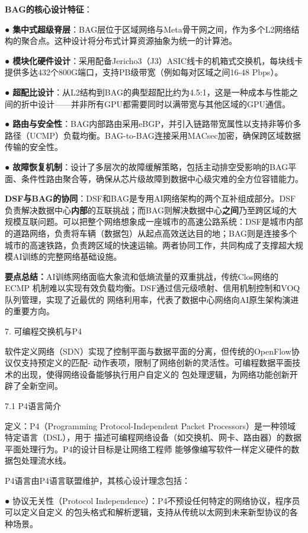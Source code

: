\textbf{BAG的核心设计特征}：

● \textbf{集中式超级脊层}：BAG层位于区域网络与Meta骨干网之间，作为多个L2网络结构的聚合点。这种设计将分布式计算资源抽象为统一的计算池。

● \textbf{模块化硬件设计}：采用配备Jericho3（J3）ASIC线卡的机箱式交换机，每块线卡提供多达432个800G端口，支持PB级带宽（例如每对区域之间16-48 Pbps）。

● \textbf{超配比设计}：从L2结构到BAG的典型超配比约为4.5:1，这是一种成本与性能之间的折中设计——并非所有GPU都需要同时以满带宽与其他区域的GPU通信。

● \textbf{路由与安全性}：BAG内部路由采用eBGP，并引入链路带宽属性以支持非等价多路径（UCMP）负载均衡。BAG-to-BAG连接采用MACsec加密，确保跨区域数据传输的安全性。

● \textbf{故障恢复机制}：设计了多层次的故障缓解策略，包括主动排空受影响的BAG平面、条件性路由聚合等，确保从芯片级故障到数据中心级灾难的全方位容错能力。

\textbf{DSF与BAG的协同}：DSF和BAG是专用AI网络架构的两个互补组成部分。DSF负责解决数据中心\textbf{内部}的互联挑战；而BAG则解决数据中心\textbf{之间}乃至跨区域的大规模互联问题。可以把整个网络想象成一座城市的高速公路系统：DSF是城市内部的道路网络，负责将车辆（数据包）从起点高效送达目的地；BAG则是连接多个城市的高速铁路，负责跨区域的快速运输。两者协同工作，共同构成了支撑超大规模AI训练的完整网络基础设施。

\vspace{0.5em}
\noindent\textbf{要点总结：}AI训练网络面临大象流和低熵流量的双重挑战，传统Clos网络的ECMP
机制难以实现有效负载均衡。DSF通过信元级喷射、信用机制控制和VOQ队列管理，实现了近最优的
网络利用率，代表了数据中心网络向AI原生架构演进的重要方向。


7.  可编程交换机与P4

软件定义网络（SDN）实现了控制平面与数据平面的分离，但传统的OpenFlow协议仅支持预定义的匹配-
动作表项，限制了网络创新的灵活性。可编程数据平面技术的出现，使得网络设备能够执行用户自定义的
包处理逻辑，为网络功能创新开辟了全新空间。

7.1  P4语言简介

定义：P4（Programming Protocol-Independent Packet Processors）是一种领域特定语言（DSL），用于
描述可编程网络设备（如交换机、网卡、路由器）的数据平面处理行为。P4的设计目标是让网络工程师
能够像编写软件一样定义硬件的数据包处理流水线。

P4语言由P4语言联盟维护，其核心设计理念包括：

● 协议无关性（Protocol Independence）：P4不预设任何特定的网络协议，程序员可以定义自定义
  的包头格式和解析逻辑，支持从传统以太网到未来新型协议的各种场景。
  
